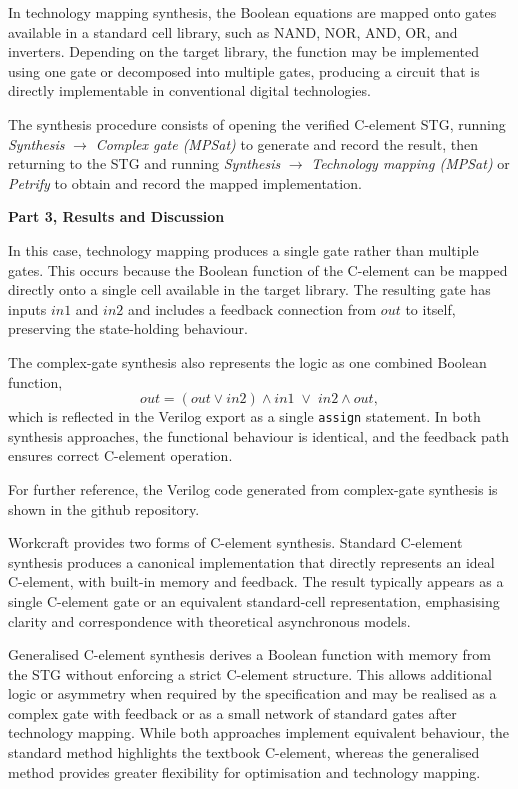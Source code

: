 \documentclass[a4paper,12pt]{article}
\begin{document}
In technology mapping synthesis, the Boolean equations are mapped onto gates available in a standard cell library, such as NAND, NOR, AND, OR, and inverters. Depending on the target library, the function may be implemented using one gate or decomposed into multiple gates, producing a circuit that is directly implementable in conventional digital technologies.

The synthesis procedure consists of opening the verified C-element STG, running \textit{Synthesis} $\rightarrow$ \textit{Complex gate (MPSat)} to generate and record the result, then returning to the STG and running \textit{Synthesis} $\rightarrow$ \textit{Technology mapping (MPSat)} or \textit{Petrify} to obtain and record the mapped implementation.

\textbf{Part 3, Results and Discussion}

In this case, technology mapping produces a single gate rather than multiple gates. This occurs because the Boolean function of the C-element can be mapped directly onto a single cell available in the target library. The resulting gate has inputs $in1$ and $in2$ and includes a feedback connection from $out$ to itself, preserving the state-holding behaviour.

The complex-gate synthesis also represents the logic as one combined Boolean function,
\[
out = (out \lor in2)\land in1 \;\lor\; in2 \land out,
\]
which is reflected in the Verilog export as a single \texttt{assign} statement. In both synthesis approaches, the functional behaviour is identical, and the feedback path ensures correct C-element operation.

For further reference, the Verilog code generated from complex-gate synthesis is shown in the github repository.

Workcraft provides two forms of C-element synthesis. Standard C-element synthesis produces a canonical implementation that directly represents an ideal C-element, with built-in memory and feedback. The result typically appears as a single C-element gate or an equivalent standard-cell representation, emphasising clarity and correspondence with theoretical asynchronous models.

Generalised C-element synthesis derives a Boolean function with memory from the STG without enforcing a strict C-element structure. This allows additional logic or asymmetry when required by the specification and may be realised as a complex gate with feedback or as a small network of standard gates after technology mapping. While both approaches implement equivalent behaviour, the standard method highlights the textbook C-element, whereas the generalised method provides greater flexibility for optimisation and technology mapping.
\end{document}
